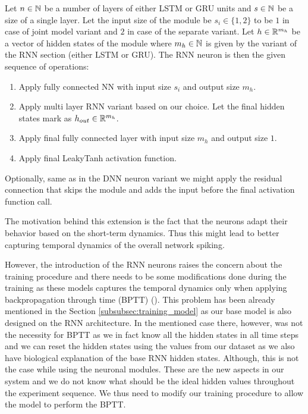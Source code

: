 \begin{defn}
    Let $n \in \mathbb{N}$ be a number of layers of either LSTM or GRU units and $s \in \mathbb{N}$ be a size of a single layer. Let the input size of the module be $s_i \in \{1, 2\}$ to be $1$ in case of joint model variant and $2$ in case of the separate variant. Let $h \in \mathbb{R}^{m_h}$ be a vector of hidden states of the module where $m_h \in \mathbb{N}$ is given by the variant of the RNN section (either LSTM or GRU). The RNN neuron is then the given sequence of operations:
    \begin{enumerate}
        \item Apply fully connected NN with input size $s_i$ and output size $m_h$.
        \item Apply multi layer RNN variant based on our choice. Let the final hidden states mark as $h_{out} \in \mathbb{R}^{m_h}$.
        \item Apply final fully connected layer with input size $m_h$ and output size $1$.
        \item Apply final LeakyTanh activation function.
    \end{enumerate}

    Optionally, same as in the DNN neuron variant we might apply the residual connection that skips the module and adds the input before the final activation function call.
\end{defn}
\label{def:rnn_neuron_module}

The motivation behind this extension is the fact that the neurons adapt their behavior based on the short-term dynamics. Thus this might lead to better capturing temporal dynamics of the overall network spiking.

However, the introduction of the RNN neurons raises the concern about the training procedure and there needs to be some modifications done during the training as these models captures the temporal dynamics only when applying backpropagation through time (BPTT) (\citet{webos1990btt}). This problem has been already mentioned in the Section \ref{subsubsec:training_model} as our base model is also designed on the RNN architecture. In the mentioned case there, however, was not the necessity for BPTT as we in fact know all the hidden states in all time steps and we can reset the hidden states using the values from our dataset as we also have biological explanation of the base RNN hidden states. Although, this is not the case while using the neuronal modules. These are the new aspects in our system and we do not know what should be the ideal hidden values throughout the experiment sequence. We thus need to modify our training procedure to allow the model to perform the BPTT.

